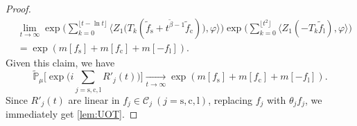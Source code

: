 \documentclass[12pt,a4paper]{amsart}
\theoremstyle{plain}
\theoremstyle{definition}
\numberwithin{equation}{section}
\begin{document}
\begin{proof}
\begin{align}
\label{eq:UOT.1}
	&\lim_{t\rightarrow\infty}\exp\Big(\sum_{k=0}^{\lfloor t-\ln t \rfloor}\big \langle Z_1\big(T_{k}(\tilde f_\mathrm s+t^{\tilde{\beta}-1}\tilde{f}_\mathrm c)\big), \varphi\big\rangle \Big)\exp\Big(\sum_{k=0}^{\lfloor t^2 \rfloor}\langle Z_1(-T_k\tilde{f}_\mathrm l),\varphi\rangle\Big)
	\\& =\exp(m[f_\mathrm s]+m[f_\mathrm c]+m[-f_\mathrm l]).
\end{align}
	Given this claim, we have
\[
	\widetilde{\mathbb P}_{\mu}\Big[\exp\Big(i \sum_{j=\mathrm s,\mathrm c,\mathrm l} R'_{j}(t)\Big)\Big]
	\xrightarrow[t\to \infty]{} \exp(m[f_\mathrm s]+m[f_\mathrm c]+m[-f_\mathrm l]).
\]
	Since $R'_{j}(t)$ are linear 
	 in $f_j \in \mathcal C_j~(j=\mathrm s,\mathrm c,\mathrm l)$, replacing $f_j$ with $\theta_j f_j$, we immediately get \eqref{lem:UOT}.


\end{proof}
\end{document}
